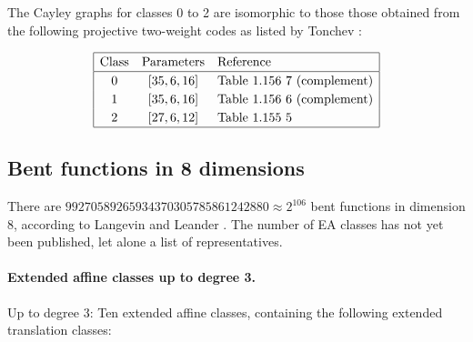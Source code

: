 \documentclass[12pt,a4paper]{article}
\begin{document}
The Cayley graphs for classes 0 to 2 are isomorphic to those those obtained from the following
projective two-weight
codes as listed by Tonchev \cite{Ton07codes}:

\begin{align*}
\def\arraystretch{1.2}
\begin{array}{|ccl|}
\hline
\text{Class} &
\text{Parameters} & \text{Reference}
\\
\hline
0 & [35,6,16] & \text{Table 1.156 7 (complement)}
\\
1 & [35,6,16] & \text{Table 1.156 6 (complement)}
\\
2 & [27,6,12] & \text{Table 1.155 5 }
\\
\hline
\end{array}
\end{align*}


\subsection{Bent functions in 8 dimensions}

There are
$99 270 589 265 934 370 305 785 861 242 880 \approx 2^{106}$ bent functions in dimension 8,
according to Langevin and Leander \cite{LanL11counting}.
%
%
The number of EA classes has not yet been published, let alone a list of representatives.

\paragraph*{Extended affine classes up to degree 3.}

Up to degree 3:
Ten extended affine classes, containing the following extended translation classes:
\end{document}
